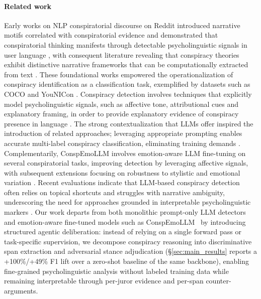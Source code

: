 \documentclass[11pt]{article}
\begin{document}
\paragraph{Related work}
Early works on NLP conspiratorial discourse on Reddit introduced narrative
motifs correlated with conspiratorial evidence \cite{online-discussions} and
demonstrated that conspiratorial thinking manifests through detectable
psycholinguistic signals in user language \cite{Klein2019Pathways}, with
consequent literature revealing that conspiracy theories exhibit distinctive
narrative frameworks that can be computationally extracted from text
\cite{Tangherlini2020Automated}. These foundational works empowered the
operationalization of conspiracy identification as a classification task,
exemplified by datasets such as COCO \cite{langguth2023coco} and YouNICon
\cite{YouNICon}. Conspiracy detection involves techniques that explicitly model
psycholinguistic signals, such as affective tone, attributional cues and
explanatory framing, in order to provide explanatory evidence of conspiracy
presence in language \cite{rains2023psycholinguistic,
    language-of-conspiracy-theories, marino-etal-2025-linguistic}. The strong
contextualization that LLMs offer inspired the introduction of related
approaches; leveraging appropriate prompting enables accurate multi-label
conspiracy classification, eliminating training demands
\cite{peskine-etal-2023-definitions}. Complementarily, ConspEmoLLM
\cite{liu2024conspemollm} involves emotion-aware LLM fine-tuning on several
conspiratorial tasks, improving detection by leveraging affective signals, with
subsequent extensions focusing on robustness to stylistic and emotional
variation \cite{liu2025conspemollmv2}. Recent evaluations indicate that
LLM-based conspiracy detection often relies on topical shortcuts and struggles
with narrative ambiguity, underscoring the need for approaches grounded in
interpretable psycholinguistic markers \cite{pustet-etal-2024-detection,
    classifying}. Our work departs from both monolithic prompt-only LLM detectors and emotion-aware fine-tuned models such as ConspEmoLLM~\cite{liu2024conspemollm} by introducing structured agentic deliberation: instead of relying on a single forward pass or task-specific supervision, we decompose conspiracy reasoning into discriminative span extraction and adversarial stance adjudication (\S\ref{sec:main_results} reports a +100\%/+49\% F1 lift over a zero-shot baseline of the same backbone), enabling fine-grained psycholinguistic analysis without labeled training data while remaining interpretable through per-juror evidence and per-span counter-arguments.
\end{document}
